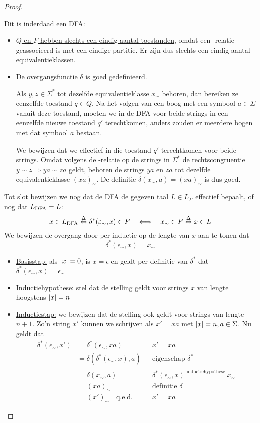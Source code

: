 \documentclass[../aanvullingen_cursus.tex]{subfiles}
\begin{document}
\begin{proof}
\begin{enumerate}
		Dit is inderdaad een DFA:
		\begin{itemize}
			\item  \underline{\(Q\) en \(F\) hebben slechts een eindig aantal toestanden}, omdat een \mnl-relatie geassocieerd is met een eindige partitie. Er zijn dus slechts een eindig aantal equivalentieklassen.
			\item \underline{De overgangsfunctie \(\delta\) is goed gedefinieerd}.

			Als \(y,z\in\Sigma^*\) tot dezelfde equivalentieklasse \(x_\sim\) behoren, dan bereiken ze eenzelfde toestand \(q\in Q\). Na het volgen van een boog met een symbool \(a \in \Sigma\) vanuit deze toestand, moeten we in de DFA voor beide strings in een eenzelfde nieuwe toestand \(q'\) terechtkomen, anders zouden er meerdere bogen met dat symbool \(a\) bestaan.

			We bewijzen dat we effectief in die toestand \(q'\) terechtkomen voor beide strings. Omdat volgens de \mnl-relatie op de strings in \(\Sigma^*\) de rechtscongruentie \(y \sim z \Rightarrow ya \sim za\) geldt, behoren de strings \(ya\) en \(za\) tot dezelfde equivalentieklasse \((xa)_\sim\). De definitie \(\delta(x_\sim,a)=(xa)_\sim\) is dus goed.
		\end{itemize}

		Tot slot bewijzen we nog dat de DFA de gegeven taal \(L \in L_\Sigma\) effectief bepaalt, of nog dat \(L_{\text{DFA}} = L\): \[x \in L_{\text{DFA}} \overset{\Delta}{\Leftrightarrow} \delta^*(\varepsilon_\sim,x)\in F \quad \Longleftrightarrow \quad x_\sim \in F \overset{\Delta}{\Leftrightarrow} x\in L \] We bewijzen de overgang door per inductie op de lengte van \(x\) aan te tonen dat \[\delta^*(\epsilon_\sim,x)=x_\sim\]
		\begin{itemize}
			\item \underline{Basisstap:} als \(\lvert x \rvert=0\), is \(x=\epsilon\) en geldt per definitie van \(\delta^*\) dat \(\delta^*(\epsilon_\sim,x)=\epsilon_\sim\)
			\item \underline{Inductiehypothese:} stel dat de stelling geldt voor strings \(x\) van lengte hoogstens \(\lvert x \rvert=n\)
			\item \underline{Inductiestap:} we bewijzen dat de stelling ook geldt voor strings van lengte \(n+1\). Zo'n string \(x'\) kunnen we schrijven als \(x'=xa\) met \(\lvert x \rvert=n,a\in \Sigma\). Nu geldt dat
			\begin{align*}
				\delta^*(\epsilon_\sim,x')&=\delta^*(\epsilon_\sim,xa) && x'=xa\\
				&=\delta\left(\delta^*(\epsilon_\sim,x),a\right) && \text{eigenschap } \delta^* \\
				&=\delta(x_\sim,a) && \delta^*(\epsilon_\sim,x) \overset{\text{inductiehypothese}}{=}x_\sim \\
				&=(xa)_\sim && \text{definitie } \delta \\
				&=(x')_\sim \quad \text{q.e.d.} && x'=xa
			\end{align*}
		\end{itemize}
	\end{enumerate}


\end{proof}
\end{document}
